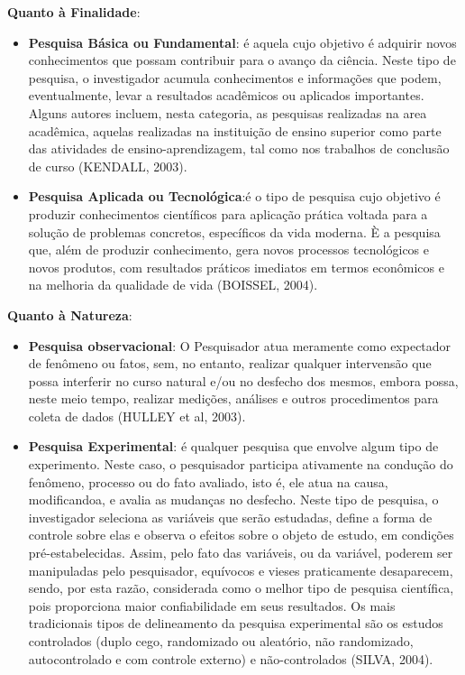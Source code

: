 \textbf{Quanto à Finalidade}: 

\begin{itemize}
\item \textbf{Pesquisa Básica ou Fundamental}: é aquela cujo objetivo é adquirir novos conhecimentos que possam contribuir para o avanço da ciência. Neste tipo de pesquisa, o investigador acumula conhecimentos e informações que podem, eventualmente, levar a resultados acadêmicos ou aplicados importantes. Alguns autores incluem, nesta categoria, as pesquisas realizadas na area acadêmica, aquelas realizadas na instituição de ensino superior como parte das atividades de ensino-aprendizagem, tal como nos trabalhos de conclusão de curso (KENDALL, 2003). 

\newpage
\item \textbf{Pesquisa Aplicada ou Tecnológica}:é o tipo de pesquisa cujo objetivo é produzir conhecimentos científicos para aplicação prática voltada para a solução de problemas concretos, específicos da vida moderna. È a pesquisa que, além de produzir conhecimento, gera novos processos tecnológicos e novos produtos, com resultados práticos imediatos em termos econômicos e na melhoria da qualidade de vida (BOISSEL, 2004).
\end{itemize}


\textbf{Quanto à Natureza}: 

\begin{itemize}
\item \textbf{Pesquisa observacional}: O Pesquisador atua meramente como expectador de fenômeno ou fatos, sem, no entanto, realizar qualquer intervensão que possa interferir no curso natural e/ou no desfecho dos mesmos, embora possa, neste meio tempo, realizar medições, análises e outros procedimentos para coleta de dados (HULLEY et al, 2003).
\item \textbf{Pesquisa Experimental}: é qualquer pesquisa que envolve algum tipo de experimento. Neste caso, o pesquisador participa ativamente na condução do fenômeno, processo ou do fato avaliado, isto é, ele atua na causa, modifican\-doa, e avalia as mudanças no desfecho. Neste tipo de pesquisa, o investigador seleciona as variáveis que serão estudadas, define a forma de controle sobre elas e observa o efeitos sobre o objeto de estudo, em condições pré-estabelecidas. Assim, pelo fato das variáveis, ou da variável, poderem ser manipuladas pelo pesquisador, equívocos e vieses praticamente  desaparecem, sendo, por esta razão, considerada como o melhor tipo de pesquisa científica, pois proporciona maior confiabilidade em seus resultados. Os mais tradicionais tipos de delineamento da pesquisa experimental são os estudos controlados (duplo cego, randomizado ou aleatório, não randomiza\-do, autocontrolado e com controle externo) e não-controlados (SILVA, 2004). 
\end{itemize}


